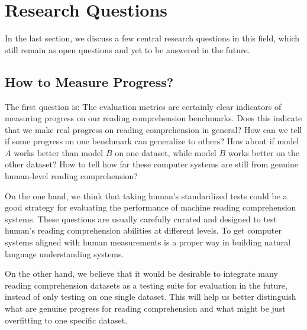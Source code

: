 
\section{Research Questions}
\label{sec:research-questions}

In the last section, we discuss a few central research questions in this field, which still remain as open questions and yet to be answered in the future.

\subsection{How to Measure Progress?}
The first question is:  The evaluation metrics are certainly clear indicators of measuring progress on our reading comprehension benchmarks. Does this indicate that we make real progress on reading comprehension in general? How can we tell if some progress on one benchmark can generalize to others? How about if model $A$ works better than model $B$ on one dataset, while model $B$ works better on the other dataset? How to tell how far these computer systems are still from genuine human-level reading comprehension?

On the one hand, we think that taking human's standardized tests could be a good strategy for evaluating the performance of machine reading comprehension systems. These questions are usually carefully curated and designed to test human's reading comprehension abilities at different levels. To get computer systems aligned with human measurements is a proper way in building natural language understanding systems.

On the other hand, we believe that it would be desirable to integrate many reading comprehension datasets as a testing suite for evaluation in the future, instead of only testing on one single dataset. This will help us better distinguish what are genuine progress for reading comprehension and what might be just overfitting to one specific dataset.

